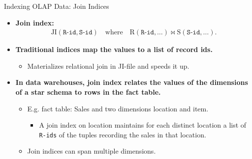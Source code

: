 \begin{frame}{Indexing OLAP Data: Join Indices}
  \begin{itemize}
  \item \textbf{Join index:}
    \begin{align}
      \text{JI}(\texttt{R-id}, \texttt{S-id}) \quad \text{where} \quad \text{R}(\texttt{R-id}, \ldots) \bowtie  \text{S}(\texttt{S-id}, \ldots).
    \end{align}
  \item \textbf{Traditional indices map the values to a list of record ids.}
    \begin{itemize}
    \item Materializes relational join in JI-file and speeds it up.
    \end{itemize}
  \item \textbf{In data warehouses, join index relates the values of the dimensions \\ of a star schema to rows in the fact table.}
    \begin{itemize}
    \item E.g. fact table: Sales and two dimensions location and item.
      \begin{itemize}
      \item A join index on location maintains for each distinct location a list of \texttt{R-ids} of the tuples recording the sales in that location.
      \end{itemize}
    \item Join indices can span multiple dimensions.
    \end{itemize}
  \end{itemize}
\end{frame}

